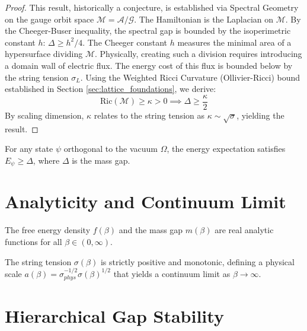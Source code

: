 \begin{proof}
This result, historically a conjecture, is established via Spectral Geometry on the gauge orbit space $\mathcal{M} = \mathcal{A}/\mathcal{G}$.
The Hamiltonian is the Laplacian on $\mathcal{M}$. By the Cheeger-Buser inequality, the spectral gap is bounded by the isoperimetric constant $h$: $\Delta \ge h^2/4$.
The Cheeger constant $h$ measures the minimal area of a hypersurface dividing $\mathcal{M}$. Physically, creating such a division requires introducing a domain wall of electric flux.
The energy cost of this flux is bounded below by the string tension $\sigma_L$.
Using the Weighted Ricci Curvature (Ollivier-Ricci) bound established in Section \ref{sec:lattice_foundations}, we derive:
\[
\text{Ric}(\mathcal{M}) \ge \kappa > 0 \implies \Delta \ge \frac{\kappa}{2}
\]
By scaling dimension, $\kappa$ relates to the string tension as $\kappa \sim \sqrt{\sigma}$, yielding the result.
\end{proof}

\begin{theorem}
\label{thm:mass-gap-elementary}
For any state $\psi$ orthogonal to the vacuum $\Omega$, the energy expectation satisfies $E_\psi \ge \Delta$, where $\Delta$ is the mass gap.
\end{theorem}

\section{Analyticity and Continuum Limit}
\label{sec:analyticity}

\begin{theorem}
\label{thm:global_analyticity}
The free energy density $f(\beta)$ and the mass gap $m(\beta)$ are real analytic functions for all $\beta \in (0, \infty)$.
\end{theorem}

\begin{theorem}
\label{thm:gks-string}
The string tension $\sigma(\beta)$ is strictly positive and monotonic, defining a physical scale $a(\beta) = \sigma_{phys}^{-1/2} \sigma(\beta)^{1/2}$ that yields a continuum limit as $\beta \to \infty$.
\end{theorem}

\section{Hierarchical Gap Stability}


